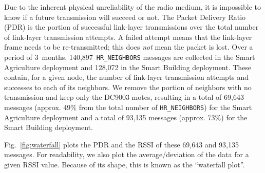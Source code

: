 \documentclass{elsarticle}
\newcommand{\building}            {Smart Building\xspace}
\newcommand{\agri}                {Smart Agriculture\xspace}
\newcommand{\HRNEIGHBORS}         {{\tt HR\_NEIGHBORS}\xspace}
\newcommand{\PEACHNUMHRNEIGHBORS} {140,897\xspace}
\newcommand{\EVANUMHRNEIGHBORS}   {128,072\xspace}
\begin{document}

Due to the inherent physical unreliability of the radio medium, it is impossible to know if a future transmission will succeed or not.
The Packet Delivery Ratio (PDR) is the portion of successful link-layer transmissions over the total number of link-layer transmission attempts.
A failed attempt means that the link-layer frame needs to be re-transmitted; this does \textit{not} mean the packet is lost.
Over a period of 3~months, \PEACHNUMHRNEIGHBORS~\HRNEIGHBORS messages are collected in the \agri deployment and \EVANUMHRNEIGHBORS in the \building deployment.
These contain, for a given node, the number of link-layer transmission attempts and successes to each of its neighbors.
We remove the portion of neighbors with no transmission and keep only the DC9003 motes, resulting in a total of 69,643 messages (approx. 49\% from the total number of \HRNEIGHBORS) for the \agri deployment and a total of 93,135 messages (approx. 73\%) for the \building deployment.


Fig.~\ref{fig:waterfall} plots the PDR and the RSSI of these 69,643 and 93,135 messages.
For readability, we also plot the average/deviation of the data for a given RSSI value.
Because of its shape, this is known as the ``waterfall plot''.
\end{document}
